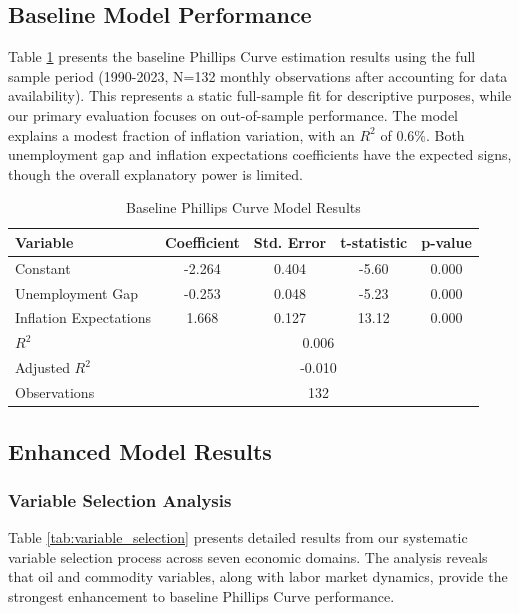 \documentclass[12pt]{article}
\begin{document}


\subsection{Baseline Model Performance}

Table \ref{tab:baseline} presents the baseline Phillips Curve estimation results using the full sample period (1990-2023, N=132 monthly observations after accounting for data availability). This represents a static full-sample fit for descriptive purposes, while our primary evaluation focuses on out-of-sample performance. The model explains a modest fraction of inflation variation, with an $R^2$ of 0.6\%. Both unemployment gap and inflation expectations coefficients have the expected signs, though the overall explanatory power is limited.

\begin{table}[H]
\centering
\caption{Baseline Phillips Curve Model Results}
\label{tab:baseline}
\begin{tabular}{lcccc}
\toprule
Variable & Coefficient & Std. Error & t-statistic & p-value \\
\midrule
Constant & -2.264 & 0.404 & -5.60 & 0.000 \\
Unemployment Gap & -0.253 & 0.048 & -5.23 & 0.000 \\
Inflation Expectations & 1.668 & 0.127 & 13.12 & 0.000 \\
\midrule
$R^2$ & \multicolumn{4}{c}{0.006} \\
Adjusted $R^2$ & \multicolumn{4}{c}{-0.010} \\
Observations & \multicolumn{4}{c}{132} \\
\bottomrule
\end{tabular}
\end{table}

\subsection{Enhanced Model Results}

\subsubsection{Variable Selection Analysis}

Table \ref{tab:variable_selection} presents detailed results from our systematic variable selection process across seven economic domains. The analysis reveals that oil and commodity variables, along with labor market dynamics, provide the strongest enhancement to baseline Phillips Curve performance.
\end{document}
